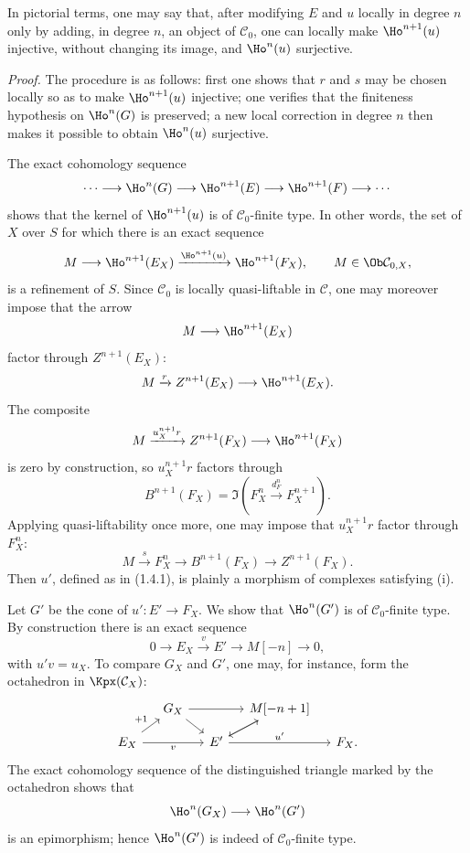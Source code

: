 \documentclass[11pt]{article}
\begin{document}
In pictorial terms, one may say that, after modifying \(E\) and \(u\) locally in degree \(n\) only by adding, in degree \(n\), an object of \(\mathcal C_0\), one can locally make \(\Ho^{n+1}(u)\) injective, without changing its image, and \(\Ho^n(u)\) surjective.

\emph{Proof.} The procedure is as follows: first one shows that \(r\) and \(s\) may be chosen locally so as to make \(\Ho^{n+1}(u)\) injective; one verifies that the finiteness hypothesis on \(\Ho^n(G)\) is preserved; a new local correction in degree \(n\) then makes it possible to obtain \(\Ho^n(u)\) surjective.

The exact cohomology sequence
\[
  \cdots\longrightarrow \Ho^n(G)\longrightarrow
  \Ho^{n+1}(E)\longrightarrow
  \Ho^{n+1}(F)\longrightarrow \cdots
\]
shows that the kernel of \(\Ho^{n+1}(u)\) is of \(\mathcal C_0\)-finite type. In other words, the set of \(X\) over \(S\) for which there is an exact sequence
\[
  M\longrightarrow \Ho^{n+1}(E_X)
  \xrightarrow{\Ho^{n+1}(u)}
  \Ho^{n+1}(F_X),
  \qquad M\in\Ob\mathcal C_{0,X},
\]
is a refinement of \(S\). Since \(\mathcal C_0\) is locally quasi-liftable in \(\mathcal C\), one may moreover impose that the arrow
\[
  M\longrightarrow \Ho^{n+1}(E_X)
\]
factor through \(Z^{n+1}(E_X)\):
\[
  M\xrightarrow{r} Z^{n+1}(E_X)\longrightarrow \Ho^{n+1}(E_X).
\]
The composite
\[
  M\xrightarrow{u_X^{n+1}r} Z^{n+1}(F_X)\longrightarrow \Ho^{n+1}(F_X)
\]
is zero by construction, so \(u_X^{n+1}r\) factors through
\[
  B^{n+1}(F_X)=\Im\!\left(F_X^n\xrightarrow{d_F^n}F_X^{n+1}\right).
\]
Applying quasi-liftability once more, one may impose that \(u_X^{n+1}r\) factor through \(F_X^n\):
\[
  M\xrightarrow{s}F_X^n\longrightarrow B^{n+1}(F_X)\longrightarrow Z^{n+1}(F_X).
\]
Then \(u'\), defined as in (1.4.1), is plainly a morphism of complexes satisfying (i).

Let \(G'\) be the cone of \(u':E'\to F_X\). We show that \(\Ho^n(G')\) is of \(\mathcal C_0\)-finite type. By construction there is an exact sequence
\[
  0\longrightarrow E_X\xrightarrow{v}E'\longrightarrow M[-n]\longrightarrow 0,
\]
with \(u'v=u_X\). To compare \(G_X\) and \(G'\), one may, for instance, form the octahedron in \(\Kpx(\mathcal C_X)\):
\[
\begin{tikzcd}[column sep=small,row sep=small]
& G_X \arrow[rr] \arrow[dr] && M[-n+1] \arrow[dl]\\
E_X \arrow[ur,"+1"] \arrow[rr,"v"'] && E' \arrow[ur] \arrow[rr,"u'"] && F_X .
\end{tikzcd}
\]
The exact cohomology sequence of the distinguished triangle marked by the octahedron shows that
\[
  \Ho^n(G_X)\longrightarrow \Ho^n(G')
\]
is an epimorphism; hence \(\Ho^n(G')\) is indeed of \(\mathcal C_0\)-finite type.
\end{document}
